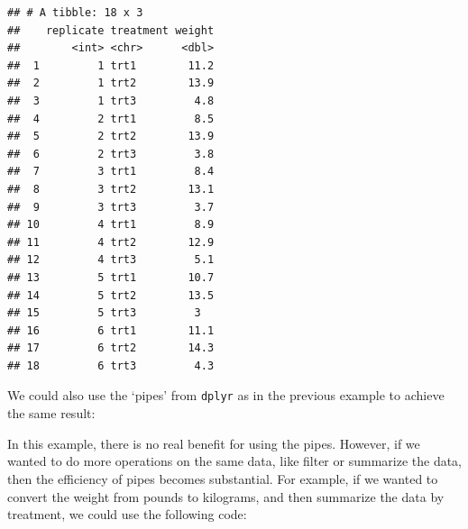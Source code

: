 \documentclass[letterpaper,]{book}
\newenvironment{Shaded}{\begin{snugshade}}{\end{snugshade}}
\newcommand{\DataTypeTok}[1]{\textcolor[rgb]{0.13,0.29,0.53}{#1}}
\newcommand{\FloatTok}[1]{\textcolor[rgb]{0.00,0.00,0.81}{#1}}
\newcommand{\KeywordTok}[1]{\textcolor[rgb]{0.13,0.29,0.53}{\textbf{#1}}}
\newcommand{\NormalTok}[1]{#1}
\newcommand{\OperatorTok}[1]{\textcolor[rgb]{0.81,0.36,0.00}{\textbf{#1}}}
\newcommand{\StringTok}[1]{\textcolor[rgb]{0.31,0.60,0.02}{#1}}
\begin{document}
\begin{verbatim}
## # A tibble: 18 x 3
##    replicate treatment weight
##        <int> <chr>      <dbl>
##  1         1 trt1        11.2
##  2         1 trt2        13.9
##  3         1 trt3         4.8
##  4         2 trt1         8.5
##  5         2 trt2        13.9
##  6         2 trt3         3.8
##  7         3 trt1         8.4
##  8         3 trt2        13.1
##  9         3 trt3         3.7
## 10         4 trt1         8.9
## 11         4 trt2        12.9
## 12         4 trt3         5.1
## 13         5 trt1        10.7
## 14         5 trt2        13.5
## 15         5 trt3         3  
## 16         6 trt1        11.1
## 17         6 trt2        14.3
## 18         6 trt3         4.3
\end{verbatim}

We could also use the `pipes' from \texttt{dplyr} as in the previous example to achieve the same result:

\begin{Shaded}
\end{Shaded}

In this example, there is no real benefit for using the pipes. However, if we wanted to do more operations on the same data, like filter or summarize the data, then the efficiency of pipes becomes substantial. For example, if we wanted to convert the weight from pounds to kilograms, and then summarize the data by treatment, we could use the following code:

\begin{Shaded}
\end{Shaded}
\end{document}
